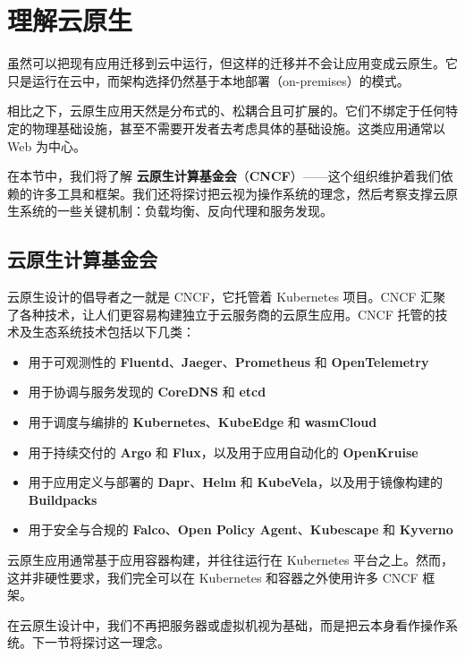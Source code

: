 \section{理解云原生}

虽然可以把现有应用迁移到云中运行，但这样的迁移并不会让应用变成云原生。它只是运行在云中，而架构选择仍然基于本地部署（on-premises）的模式。

\label{idx:1922}
相比之下，云原生应用天然是分布式的、松耦合且可扩展的。它们不绑定于任何特定的物理基础设施，甚至不需要开发者去考虑具体的基础设施。这类应用通常以 Web 为中心。

在本节中，我们将了解 \textbf{云原生计算基金会}（\textbf{CNCF}）——这个组织维护着我们依赖的许多工具和框架。我们还将探讨把云视为操作系统的理念，然后考察支撑云原生系统的一些关键机制：负载均衡、反向代理和服务发现。

\subsection{云原生计算基金会}

\label{idx:1923}
\label{idx:1924}
云原生设计的倡导者之一就是 CNCF，它托管着 Kubernetes 项目。CNCF 汇聚了各种技术，让人们更容易构建独立于云服务商的云原生应用。CNCF 托管的技术及生态系统技术包括以下几类：

\begin{itemize}
\item 用于可观测性的 \textbf{Fluentd}、\textbf{Jaeger}、\textbf{Prometheus} 和\textbf{ OpenTelemetry }
\item 用于协调与服务发现的 \textbf{CoreDNS }和\textbf{ etcd }
\item 用于调度与编排的 \textbf{Kubernetes}、\textbf{KubeEdge} 和\textbf{ wasmCloud }
\item 用于持续交付的 \textbf{Argo} 和 \textbf{Flux}，以及用于应用自动化的 \textbf{OpenKruise}
\item 用于应用定义与部署的 \textbf{Dapr}、\textbf{Helm} 和 \textbf{KubeVela}，以及用于镜像构建的 \textbf{Buildpacks}
\item 用于安全与合规的 \textbf{Falco}、\textbf{Open Policy Agent}、\textbf{Kubescape} 和 \textbf{Kyverno }
\end{itemize}

云原生应用通常基于应用容器构建，并往往运行在 Kubernetes 平台之上。然而，这并非硬性要求，我们完全可以在 Kubernetes 和容器之外使用许多 CNCF 框架。

\label{idx:1925}
\label{idx:1926}
在云原生设计中，我们不再把服务器或虚拟机视为基础，而是把云本身看作操作系统。下一节将探讨这一理念。

